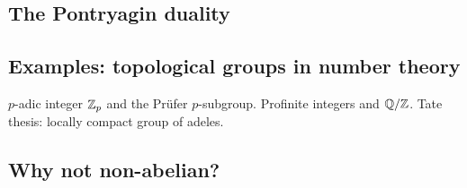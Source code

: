 \documentclass[12pt]{article}
\begin{document}
\subsection{The Pontryagin duality}
\subsection{Examples: topological groups in number theory}
$p$-adic integer $\mathbb{Z}_p$ and the Pr\"ufer $p$-subgroup.
Profinite integers and $\mathbb{Q}/\mathbb{Z}$.
Tate thesis: locally compact group of adeles.

\subsection{Why not non-abelian?}





\end{document}
